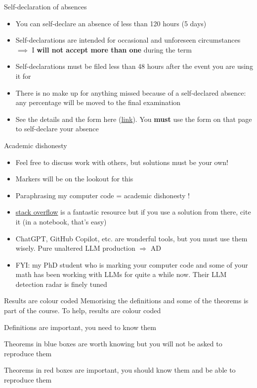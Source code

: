 \documentclass[aspectratio=169]{beamer}\usepackage[]{graphicx}\usepackage[]{xcolor}
\begin{document}
\begin{frame}{Self-declaration of absences}
\begin{itemize}
\item You can self-declare an absence of less than 120 hours (5 days)
\vfill
\item Self-declarations are intended for occasional and unforeseen circumstances $\implies$ I \textbf{will not accept more than one} during the term
\vfill
\item Self-declarations must be filed less than 48 hours after the event you are using it for
\vfill
\item There is no make up for anything missed because of a self-declared absence: any percentage will be moved to the final examination
\vfill
\item See the details and the form here (\href{https://umanitoba.ca/student-supports/academic-supports/student-advocacy/self-declaration-policy-students}{link}). You \textbf{must} use the form on that page to self-declare your absence
\end{itemize}
\end{frame}

\begin{frame}{Academic dishonesty}
\begin{itemize}
\item Feel free to discuss work with others, but solutions must be your own!
\vfill
\item Markers will be on the lookout for this
\vfill
\item Paraphrasing my computer code = academic dishonesty !
\vfill
\item \href{https://stackoverflow.com/}{stack overflow} is a fantastic resource but if you use a solution from there, cite it (in a notebook, that's easy)
\vfill
\item ChatGPT, GitHub Copilot, etc. are wonderful tools, but you must use them wisely. Pure unaltered LLM production $\Rightarrow$ AD
\vfill
\item FYI: my PhD student who is marking your computer code and some of your math has been working with LLMs for quite a while now. Their LLM detection radar is finely tuned
\end{itemize}
\end{frame}

\begin{frame}{Results are colour coded}
Memorising the definitions and some of the theorems is part of the course. To help, results are colour coded
\vfill
\begin{definition}[Definitions]
Definitions are important, you need to know them
\end{definition}
\vfill
\begin{theorem}[Theorems]
Theorems in blue boxes are worth knowing but you will not be asked to reproduce them
\end{theorem}
\vfill
\begin{importanttheorem}  
Theorems in red boxes are important, you should know them and be able to reproduce them
\end{importanttheorem}
\end{frame}
\end{document}
